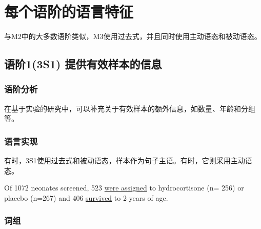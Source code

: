 \documentclass[a4paper]{ctexbook}
\begin{document}
\section{每个语阶的语言特征}

与M2中的大多数语阶类似，M3使用过去式，并且同时使用主动语态和被动语态。

  \subsection{语阶1(3S1) 提供有效样本的信息}
    \subsubsection{语阶分析}

    在基于实验的研究中，可以补充关于有效样本的额外信息，如数量、年龄和分组等。

    \subsubsection{语言实现}

    有时，3S1使用过去式和被动语态，样本作为句子主语。有时，它则采用主动语态。

    \begin{eg}{}
      Of 1072 neonates screened, 523 \uline{were assigned} to hydrocortisone (n= 256) or placebo (n=267) and 406 \uline{survived} to 2 years of age.  
    \end{eg}

    \subsubsection{词组}
\end{document}
